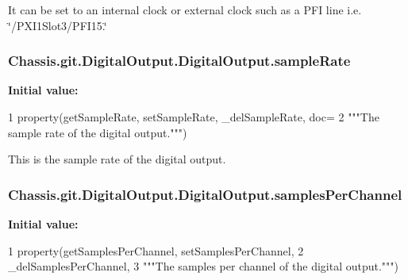 It can be set to an internal clock or external clock such as a P\-F\-I line i.\-e. \char`\"{}/\-P\-X\-I1\-Slot3/\-P\-F\-I15.\char`\"{} \hypertarget{class_chassis_8git_1_1_digital_output_1_1_digital_output_a46deeb00292a346ffa3eb95ab37118ac}{
\subsubsection[{sample\-Rate}]{\setlength{\rightskip}{0pt plus 5cm}Chassis.\-git.\-Digital\-Output.\-Digital\-Output.\-sample\-Rate\hspace{0.3cm}{\ttfamily [static]}}}\label{class_chassis_8git_1_1_digital_output_1_1_digital_output_a46deeb00292a346ffa3eb95ab37118ac}
{\bfseries Initial value\-:}
\begin{DoxyCode}
1 property(getSampleRate, setSampleRate, \_delSampleRate, doc=
2                              \textcolor{stringliteral}{"""The sample rate of the digital output."""})
\end{DoxyCode}


This is the sample rate of the digital output. 

\hypertarget{class_chassis_8git_1_1_digital_output_1_1_digital_output_af81269c5bfd307e6b82d645552e5a13f}{
\subsubsection[{samples\-Per\-Channel}]{\setlength{\rightskip}{0pt plus 5cm}Chassis.\-git.\-Digital\-Output.\-Digital\-Output.\-samples\-Per\-Channel\hspace{0.3cm}{\ttfamily [static]}}}\label{class_chassis_8git_1_1_digital_output_1_1_digital_output_af81269c5bfd307e6b82d645552e5a13f}
{\bfseries Initial value\-:}
\begin{DoxyCode}
1 property(getSamplesPerChannel, setSamplesPerChannel,
2             \_delSamplesPerChannel,
3             \textcolor{stringliteral}{"""The samples per channel of the digital output."""})
\end{DoxyCode}


